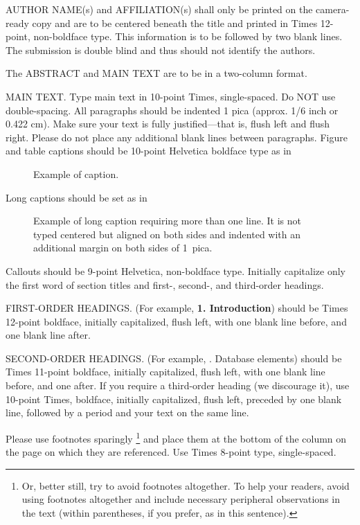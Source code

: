 \documentclass[times, 10pt,twocolumn]{article}
\begin{document}
AUTHOR NAME(s) and AFFILIATION(s) shall only be printed on the
camera-ready copy and are to be centered beneath the title 
and printed in Times 12-point, non-boldface type. This information is to 
be followed by two blank lines. The submission is double blind and
thus should not identify the authors.

The ABSTRACT and MAIN TEXT are to be in a two-column format. 

MAIN TEXT. Type main text in 10-point Times, single-spaced. Do NOT use 
double-spacing. All paragraphs should be indented 1 pica (approx. 1/6 
inch or 0.422 cm). Make sure your text is fully justified---that is, 
flush left and flush right. Please do not place any additional blank 
lines between paragraphs. Figure and table captions should be 10-point 
Helvetica boldface type as in
\begin{figure}[h]
   \caption{Example of caption.}
\end{figure}

\noindent Long captions should be set as in 
\begin{figure}[h] 
   \caption{Example of long caption requiring more than one line. It is 
     not typed centered but aligned on both sides and indented with an 
     additional margin on both sides of 1~pica.}
\end{figure}

\noindent Callouts should be 9-point Helvetica, non-boldface type. 
Initially capitalize only the first word of section titles and first-, 
second-, and third-order headings.

FIRST-ORDER HEADINGS. (For example, {\large \bf 1. Introduction}) 
should be Times 12-point boldface, initially capitalized, flush left, 
with one blank line before, and one blank line after.

SECOND-ORDER HEADINGS. (For example, {. Database elements}) 
should be Times 11-point boldface, initially capitalized, flush left, 
with one blank line before, and one after. If you require a third-order 
heading (we discourage it), use 10-point Times, boldface, initially 
capitalized, flush left, preceded by one blank line, followed by a period 
and your text on the same line.


Please use footnotes sparingly%
\footnote
   {%
     Or, better still, try to avoid footnotes altogether.  To help your 
     readers, avoid using footnotes altogether and include necessary 
     peripheral observations in the text (within parentheses, if you 
     prefer, as in this sentence).
   }
and place them at the bottom of the column on the page on which they are 
referenced. Use Times 8-point type, single-spaced.
\end{document}
